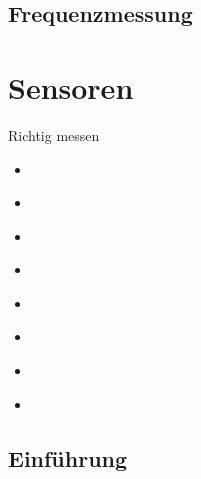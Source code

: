 \documentclass[letterpaper,10pt,english]{jupyterBook}
\begin{document}
\section{Frequenzmessung}
\label{\detokenize{content/4_F-Messung:frequenzmessung}}\label{\detokenize{content/4_F-Messung::doc}}
\sphinxstepscope


\chapter{Sensoren}
\label{\detokenize{content/6_Sensoren:sensoren}}\label{\detokenize{content/6_Sensoren::doc}}
\sphinxAtStartPar
Richtig messen
\begin{itemize}
\item {} 
\sphinxAtStartPar
{\hyperref[\detokenize{content/6_Einf_xfchrung::doc}]{}}

\item {} 
\sphinxAtStartPar
{\hyperref[\detokenize{content/6_DMS::doc}]{}}

\item {} 
\sphinxAtStartPar
{\hyperref[\detokenize{content/6_PZT::doc}]{}}

\item {} 
\sphinxAtStartPar
{\hyperref[\detokenize{content/6_Kapazitiv::doc}]{}}

\item {} 
\sphinxAtStartPar
{\hyperref[\detokenize{content/6_Druck::doc}]{}}

\item {} 
\sphinxAtStartPar
{\hyperref[\detokenize{content/6_Temp::doc}]{}}

\item {} 
\sphinxAtStartPar
{\hyperref[\detokenize{content/6_W_xe4rme::doc}]{}}

\item {} 
\sphinxAtStartPar
{\hyperref[\detokenize{content/6_OMT::doc}]{}}

\end{itemize}

\sphinxstepscope


\section{Einführung}
\label{\detokenize{content/6_Einf_xfchrung:einfuhrung}}\label{\detokenize{content/6_Einf_xfchrung::doc}}
\sphinxstepscope
\end{document}
